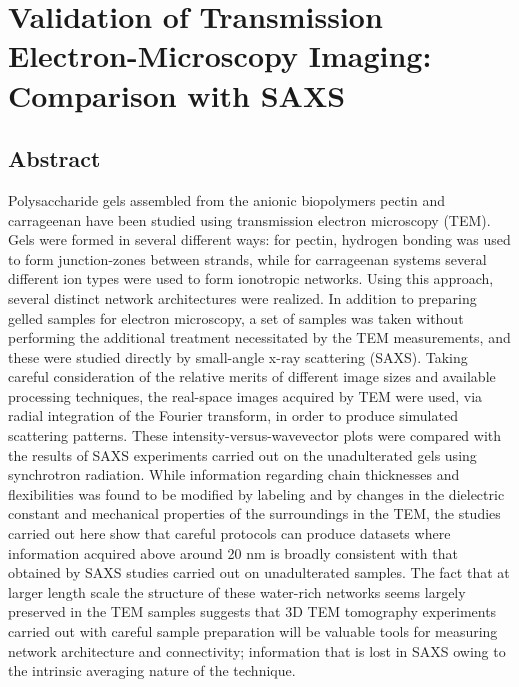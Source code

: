 
\chapter{Validation of Transmission Electron-Microscopy Imaging: Comparison with SAXS}

\label{Chapter-TEMSAXS} %


\section{Abstract}
\noindent
Polysaccharide gels assembled from the anionic biopolymers pectin and carrageenan have been studied using transmission electron microscopy (TEM). Gels were formed in several different ways: for pectin, hydrogen bonding was used to form junction-zones between strands, while for carrageenan systems several different ion types were used to form ionotropic networks. Using this approach, several distinct network architectures were realized. In addition to preparing gelled samples for electron microscopy, a set of samples was taken without performing the additional treatment necessitated by the TEM measurements, and these were studied directly by small-angle x-ray scattering (SAXS). Taking careful consideration of the relative merits of different image sizes and available processing techniques, the real-space images acquired by TEM were used, via radial integration of the Fourier transform, in order to produce simulated scattering patterns. These intensity-versus-wavevector plots were compared with the results of SAXS experiments carried out on the unadulterated gels using synchrotron radiation. While information regarding chain thicknesses and flexibilities was found to be modified by labeling and by changes in the dielectric constant and mechanical properties of the surroundings in the TEM, the studies carried out here show that careful protocols can produce datasets where information acquired above around 20 nm is broadly consistent with that obtained by SAXS studies carried out on unadulterated samples. The fact that at larger length scale the structure of these water-rich networks seems largely preserved in the TEM samples suggests that 3D TEM tomography experiments carried out with careful sample preparation will be valuable tools for measuring network architecture and connectivity; information that is lost in SAXS owing to the intrinsic averaging nature of the technique.

